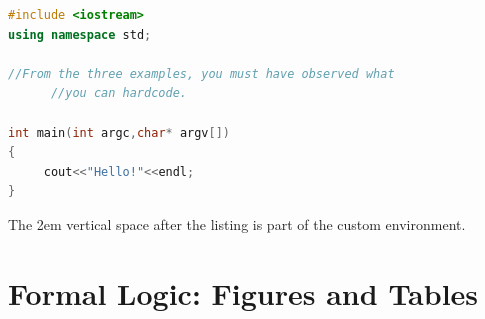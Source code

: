 \documentclass{article}
\begin{document}
\begin{lstlisting}[language=C++]
#include <iostream>
using namespace std;

//From the three examples, you must have observed what
      //you can hardcode.

int main(int argc,char* argv[])
{
     cout<<"Hello!"<<endl;
}
\end{lstlisting}

\vspace{3em}


The 2em vertical space after the listing is part of the custom environment.

\newpage


\section{Formal Logic: Figures and Tables}

\begin{figure}[H]
    \centering
    \begin{floatrow}
    \end{floatrow}
\end{figure}
\end{document}
